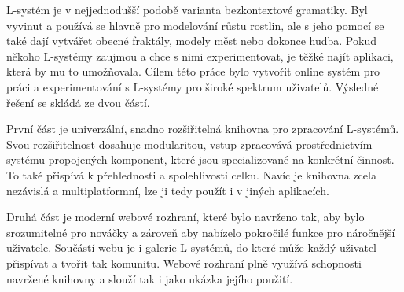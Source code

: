 \documentclass[12pt,a4paper]{report}
\begin{document}
\pagestyle{empty}

\mbox{L-systém} je v nejjednodušší podobě varianta bezkontextové gramatiky.
Byl vyvi\-nut a používá se hlavně pro modelování růstu rostlin, ale s jeho pomocí se také dají vytvářet obecné fraktály, modely měst nebo dokonce hudba.
Pokud někoho \mbox{L-systémy} zaujmou a chce s nimi experimentovat, je těžké najít aplikaci, která by mu to umožňovala.
Cílem této práce bylo vytvořit online systém pro práci a experimentování s L-systémy pro široké spektrum uživatelů.
Výsledné řešení se skládá ze dvou částí.

První část je univerzální, snadno rozšiřitelná knihovna pro zpracování \mbox{L-sys}\-témů.
Svou rozšiřitelnost dosahuje modularitou, vstup zpracovává pros\-třednic\-tvím systému propojených komponent, které jsou specializované na kon\-krét\-ní činnost.
To také přispívá k přehlednosti a spolehlivosti celku.
Navíc je knihovna zcela nezávislá a multiplatformní, lze ji tedy použít i v jiných aplikacích.

Druhá část je moderní webové rozhraní, které bylo navrženo tak, aby bylo srozumitelné pro nováčky a zároveň aby nabízelo pokročilé funkce pro nároč\-nější uživatele.
Součástí webu je i galerie L-systémů, do které může každý uživatel přispívat a tvořit tak komunitu.
Webové rozhraní plně využívá schopnosti navr\-žené knihovny a slouží tak i jako ukázka jejího použití.
\end{document}
